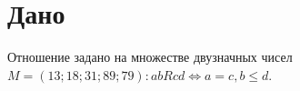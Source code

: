 \chapter*{Дано}
\label{ch:task}

Отношение задано на множестве двузначных чисел $M=(13;18;31;89;79) : abRcd \Leftrightarrow a = c, b \leq d$.

\endinput